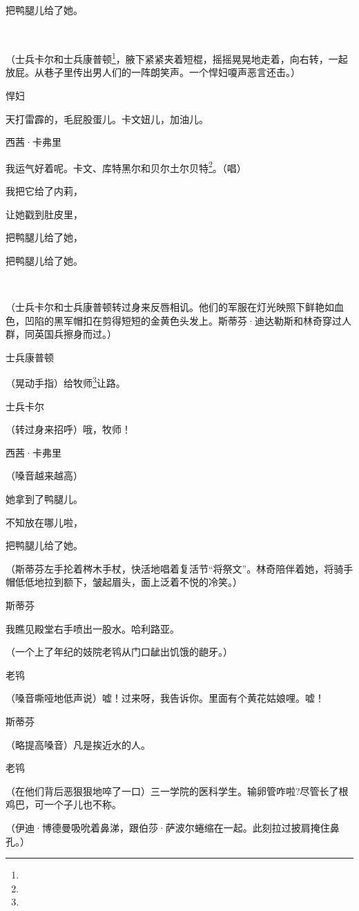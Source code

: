 \par 把鸭腿儿给了她。
\par  
\par （士兵卡尔和士兵康普顿\footnote{}，腋下紧紧夹着短棍，摇摇晃晃地走着，向右转，一起放屁。从巷子里传出男人们的一阵朗笑声。一个悍妇嗄声恶言还击。）
\par 悍妇
\par 天打雷霹的，毛屁股蛋儿。卡文妞儿，加油儿。
\par 西茜·卡弗里
\par 我运气好着呢。卡文、库特黑尔和贝尔土尔贝特\footnote{}。（唱）
\par 我把它给了内莉，
\par 让她戳到肚皮里，
\par 把鸭腿儿给了她，
\par 把鸭腿儿给了她。
\par  
\par （士兵卡尔和士兵康普顿转过身来反唇相讥。他们的军服在灯光映照下鲜艳如血色，凹陷的黑军帽扣在剪得短短的金黄色头发上。斯蒂芬·迪达勒斯和林奇穿过人群，同英国兵擦身而过。）
\par 士兵康普顿
\par （晃动手指）给牧师\footnote{}让路。
\par 士兵卡尔
\par （转过身来招呼）哦，牧师！
\par 西茜·卡弗里
\par （嗓音越来越高）
\par 她拿到了鸭腿儿。
\par 不知放在哪儿啦，
\par 把鸭腿儿给了她。
\par （斯蒂芬左手抡着梣木手杖，快活地唱着复活节“将祭文”。林奇陪伴着她，将骑手帽低低地拉到额下，皱起眉头，面上泛着不悦的冷笑。）
\par 斯蒂芬
\par 我瞧见殿堂右手喷出一股水。哈利路亚。
\par （一个上了年纪的妓院老鸨从门口龇出饥饿的龅牙。）
\par 老鸨
\par （嗓音嘶哑地低声说）嘘！过来呀，我告诉你。里面有个黄花姑娘哩。嘘！
\par 斯蒂芬
\par （略提高嗓音）凡是挨近水的人。
\par 老鸨
\par （在他们背后恶狠狠地啐了一口）三一学院的医科学生。输卵管咋啦?尽管长了根鸡巴，可一个子儿也不称。
\par （伊迪·博德曼吸吮着鼻涕，跟伯莎·萨波尔蜷缩在一起。此刻拉过披肩掩住鼻孔。）
